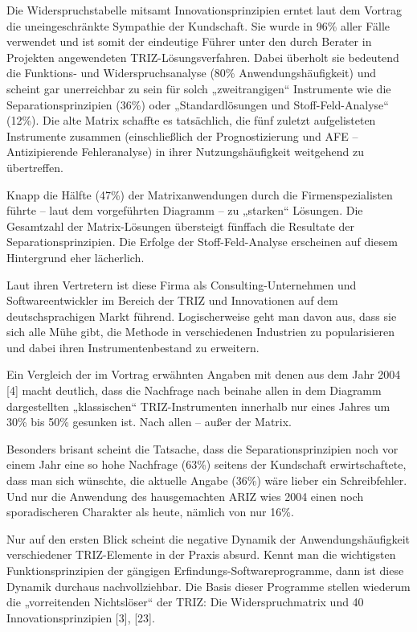 \documentclass[11pt,a4paper]{article}
\begin{document}
Die Widerspruchstabelle mitsamt Innovationsprinzipien erntet laut dem Vortrag
die uneingeschränkte Sympathie der Kundschaft. Sie wurde in 96\% aller Fälle
verwendet und ist somit der eindeutige Führer unter den durch Berater in
Projekten angewendeten TRIZ-Lösungsverfahren. Dabei überholt sie bedeutend
die Funktions- und Widerspruchsanalyse (80\% Anwendungshäufigkeit) und scheint
gar unerreichbar zu sein für solch „zweitrangigen“ Instrumente wie die
Separationsprinzipien (36\%) oder „Standardlösungen und Stoff-Feld-Analyse“
(12\%). Die alte Matrix schaffte es tatsächlich, die fünf zuletzt
aufgelisteten Instrumente zusammen (einschließlich der Prognostizierung und
AFE – Antizipierende Fehleranalyse) in ihrer Nutzungshäufigkeit weitgehend zu
übertreffen.

Knapp die Hälfte (47\%) der Matrixanwendungen durch die Firmenspezialisten
führte – laut dem vorgeführten Diagramm – zu „starken“ Lösungen. Die
Gesamtzahl der Matrix-Lösungen übersteigt fünffach die Resultate der
Separationsprinzipien. Die Erfolge der Stoff-Feld-Analyse erscheinen auf
diesem Hintergrund eher lächerlich.

Laut ihren Vertretern ist diese Firma als Consulting-Unternehmen und
Softwareentwickler im Bereich der TRIZ und Innovationen auf dem
deutschsprachigen Markt führend. Logischerweise geht man davon aus, dass sie
sich alle Mühe gibt, die Methode in verschiedenen Industrien zu popularisieren
und dabei ihren Instrumentenbestand zu erweitern.

Ein Vergleich der im Vortrag erwähnten Angaben mit denen aus dem Jahr 2004 [4]
macht deutlich, dass die Nachfrage nach beinahe allen in dem Diagramm
dargestellten „klassischen“ TRIZ-Instrumenten innerhalb nur eines Jahres um
30\% bis 50\% gesunken ist.  Nach allen – außer der Matrix.

Besonders brisant scheint die Tatsache, dass die Separationsprinzipien noch
vor einem Jahr eine so hohe Nachfrage (63\%) seitens der Kundschaft
erwirtschaftete, dass man sich wünschte, die aktuelle Angabe (36\%) wäre
lieber ein Schreibfehler. Und nur die Anwendung des hausgemachten ARIZ wies
2004 einen noch sporadischeren Charakter als heute, nämlich von nur 16\%.

Nur auf den ersten Blick scheint die negative Dynamik der Anwendungshäufigkeit
verschiedener TRIZ-Elemente in der Praxis absurd. Kennt man die wichtigsten
Funktionsprinzipien der gängigen Erfindungs-Softwareprogramme, dann ist diese
Dynamik durchaus nachvollziehbar. Die Basis dieser Programme stellen wiederum
die „vorreitenden Nichtslöser“ der TRIZ: Die Widerspruchmatrix und 40
Innovationsprinzipien [3], [23].
\end{document}
